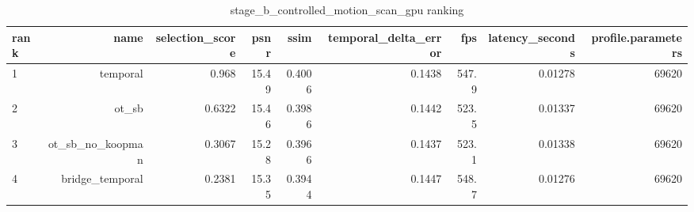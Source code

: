\begin{table}[t]
\centering
\caption{stage\_b\_controlled\_motion\_scan\_gpu ranking}
\begin{tabular}{lrrrrrrrr}
\toprule
rank & name & selection\_score & psnr & ssim & temporal\_delta\_error & fps & latency\_seconds & profile.parameters \\
\midrule
1 & temporal & 0.968 & 15.49 & 0.4006 & 0.1438 & 547.9 & 0.01278 & 69620 \\
2 & ot\_sb & 0.6322 & 15.46 & 0.3986 & 0.1442 & 523.5 & 0.01337 & 69620 \\
3 & ot\_sb\_no\_koopman & 0.3067 & 15.28 & 0.3966 & 0.1437 & 523.1 & 0.01338 & 69620 \\
4 & bridge\_temporal & 0.2381 & 15.35 & 0.3944 & 0.1447 & 548.7 & 0.01276 & 69620 \\
\bottomrule
\end{tabular}
\end{table}
